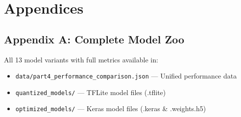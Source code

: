 \documentclass[10pt, a4paper]{article}
\begin{document}
\section*{Appendices}

\subsection*{Appendix A: Complete Model Zoo}

All 13 model variants with full metrics available in:
\begin{itemize}
    \item \texttt{data/part4\_performance\_comparison.json} — Unified performance data
    \item \texttt{quantized\_models/} — TFLite model files (.tflite)
    \item \texttt{optimized\_models/} — Keras model files (.keras \& .weights.h5)
\end{itemize}

\end{document}
